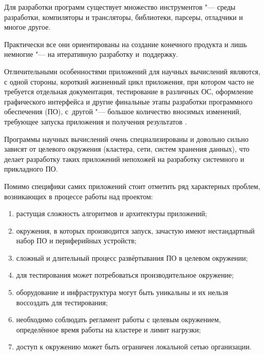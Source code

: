 








Для разработки программ существует множество инструментов "--- среды разработки, компиляторы и трансляторы, библиотеки, парсеры, отладчики и многое другое. 

Практически все они ориентированы на создание конечного продукта и лишь немногие "--- на итеративную разработку и~поддержку. 

Отличительными особенностями приложений для научных вычислений являются, с одной стороны, короткий жизненный цикл приложения, при котором часто не требуется отдельная документация, тестирование в различных ОС, оформление графического интерфейса и другие финальные этапы разработки программного обеспечения (ПО), с~другой "--- большое количество вносимых изменений, требующее запуска приложения и получения результатов \cite[p.~50--54]{Keyes2013Challenges}. 

Программы научных вычислений очень специализированы и довольно сильно зависят от целевого окружения (кластера, сети, систем хранения данных), что делает разработку таких приложений непохожей на разработку системного и прикладного ПО.



Помимо специфики самих приложений стоит отметить ряд характерных проблем, возникающих в процессе работы над проектом:

\begin{enumerate}

\item растущая сложность алгоритмов и архитектуры приложений;

\item окружения, в которых производится запуск, зачастую имеют нестандартный набор ПО и периферийных устройств;

\item сложный и длительный процесс развёртывания ПО в целевом окружении;

\item для тестирования может потребоваться производительное окружение;

\item оборудование и инфраструктура могут быть уникальны и их нельзя воссоздать для тестирования;

\item необходимо соблюдать регламент работы с целевым окружением, определённое время работы на кластере и лимит нагрузки;

\item доступ к окружению может быть ограничен локальной сетью организации.

\end{enumerate}



